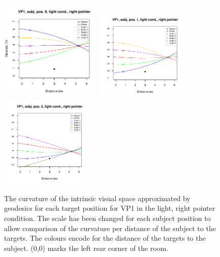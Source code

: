 \begin{figure}
    \includegraphics[clip, trim = 0.1cm 0.5cm 0.95cm 0.6cm, width=4.85cm]{Images/plots/VP1lightrightPos0Curves.pdf}
    \includegraphics[clip, trim = 1.15cm 0.5cm 0.95cm 0.6cm, width=4.4cm]{Images/plots/VP1lightrightPos1Curves.pdf}
    \includegraphics[clip, trim = 1.15cm 0.5cm 0.95cm 0.6cm, width=4.4cm]{Images/plots/VP1lightrightPos2Curves.pdf}
    \caption{The curvature of the intrinsic visual space approximated by geodesics for each target position for VP1 in the light, right pointer condition. The scale has been changed for each subject position to allow comparison of the curvature per distance of the subject to the targets. The colours encode for the distance of the targets to the subject. (0,0) marks the left rear corner of the room.}
    \label{VP1Curves}
\end{figure}

